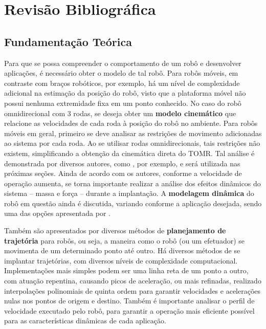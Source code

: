 \section{Revisão Bibliográfica}
\label{sec:revbib}

\subsection{Fundamentação Teórica}

Para que se possa compreender o comportamento de um robô e desenvolver aplicações, é necessário obter o modelo de tal robô. Para robôs móveis, em contraste com braços robóticos, por exemplo, há um nível de complexidade adicional na estimação da posição do robô, visto que a plataforma móvel não possui nenhuma extremidade fixa em um ponto conhecido. No caso do robô omnidirecional com 3 rodas, se deseja obter um \textbf{modelo cinemático} que relacione as velocidades de cada roda à posição do robô no ambiente. Para robôs móveis em geral, primeiro se deve analisar as restrições de movimento adicionadas ao sistema por cada roda. Ao se utilisar rodas omnidirecionais, tais restrições não existem, simplificando a obtenção da cinemática direta do TOMR. Tal análise é demonstrada por diversos autores, como \cite{siegwart2011introduction}, por exemplo, e será utilizada nas próximas seções. Ainda de acordo com os autores, conforme a velocidade de operação aumenta, se torna importante realizar a análise dos efeitos dinâmicos do sistema -- massa e força -- durante a implantação. A \textbf{modelagem dinâmica} do robô em questão ainda é discutida, variando conforme a aplicação desejada, sendo uma das opções apresentada por \cite{kim2014minenergy}.

Também são apresentados por \cite{lynch2017modern} diversos métodos de \textbf{planejamento de trajetória} para robôs, ou seja, a maneira como o robô (ou um efetuador) se movimenta de um determinado ponto até outro. Há diversos métodos de se implantar trajetórias, com diversos níveis de complexidade computacional. Implementações mais simples podem ser uma linha reta de um ponto a outro, com atuação repentina, causando picos de aceleração, ou mais refinadas, realizado interpolações polinomiais de quinta ordem para garantir velocidades e acelerações nulas nos pontos de origem e destino. Também é importante analisar o perfil de velocidade executado pelo robô, para garantir a operação mais eficiente possível para as características dinâmicas de cada aplicação.

